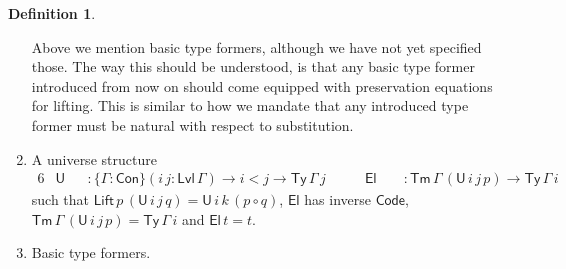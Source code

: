 \documentclass[a4paper,UKenglish,cleveref, autoref, thm-restate]{lipics-v2021}
\theoremstyle{remark}
\theoremstyle{definition}
\newtheorem{mydefinition}{Definition}
\newcommand{\Con}{\mathsf{Con}}
\newcommand{\Ty}{\mathsf{Ty}}
\newcommand{\Tm}{\mathsf{Tm}}
\newcommand{\U}{\mathsf{U}}
\newcommand{\El}{\mathsf{El}}
\newcommand{\Lift}{\mathsf{Lift}}
\newcommand{\Lvl}{\mathsf{Lvl}}
\renewcommand{\U}{\mathsf{U}}
\newcommand{\Code}{\mathsf{Code}}
\begin{document}
\begin{mydefinition}
\begin{enumerate}
  Above we mention basic type formers, although we have not yet specified
  those. The way this should be understood, is that any basic type former
  introduced from now on should come equipped with preservation equations for
  lifting. This is similar to how we mandate that any introduced type former
  must be natural with respect to substitution.
\item A universe structure
  \begin{alignat*}{6}
    &\U  &&: \{\Gamma : \Con\}(i\,j : \Lvl\,\Gamma) \to i < j \to \Ty\,\Gamma\,j\hspace{2em}
    &\El\,\,&&: \Tm\,\Gamma\,(\U\,i\,j\,p) \to \Ty\,\Gamma\,i
  \end{alignat*}
  such that $\Lift\,p\,(\U\,i\,j\,q) = \U\,i\,k\,(p \circ q)$, $\El$ has
  inverse $\Code$, $\Tm\,\Gamma\,(\U\,i\,j\,p) = \Ty\,\Gamma\,i$ and $\El\,t =
  t$.
\item Basic type formers.
\end{enumerate}
\end{mydefinition}
\end{document}
